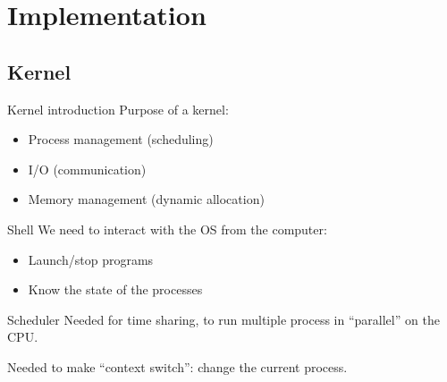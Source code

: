 \documentclass{beamer}
\begin{document}
  \section{Implementation}

    \subsection{Kernel}
      \begin{frame}{Kernel introduction}
        Purpose of a kernel:
        \begin{itemize}
          \item Process management (scheduling)
          \item I/O (communication)
          \item Memory management (dynamic allocation)
        \end{itemize}
      \end{frame}

      \begin{frame}{Shell}
          We need to interact with the OS from the computer:
          \begin{itemize}
            \item Launch/stop programs
            \item Know the state of the processes
          \end{itemize}
      \end{frame}

      \begin{frame}{Scheduler}
        Needed for time sharing, to run multiple process in ``parallel'' on the
        CPU.

        \begin{figure}
            \centering
        \end{figure}

        Needed to make ``context switch'': change the current process.
      \end{frame}
\end{document}
